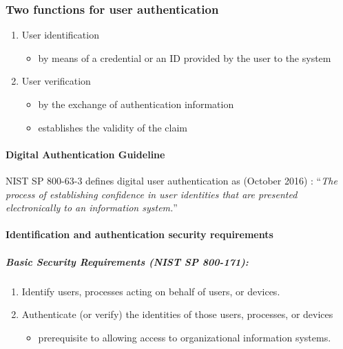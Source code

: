 \documentclass{article}
\begin{document}
                \subsubsection{Two functions for user authentication}
                \begin{enumerate}
                    \item User identification
                    \begin{itemize}
                        \item by means of a credential or an ID provided by the user to the system
                    \end{itemize}
                    \item User verification
                    \begin{itemize}
                        \item by the exchange of authentication information
                        \item establishes the validity of the claim
                    \end{itemize}
                \end{enumerate}
                \paragraph{Digital
                Authentication
                Guideline} NIST SP 800-63-3 defines digital user
                authentication as (October 2016) :
                “\textit{The process of establishing confidence in user
                identities that are presented electronically to an
                information system.}”
                \paragraph{Identification
                and
                authentication
                security
                requirements}

                \subparagraph{Basic Security Requirements (NIST SP 800-171):}
                \begin{enumerate}
                    \item Identify users, processes acting on behalf of users, or devices.
                    \item Authenticate (or verify) the identities of those users, processes, or devices
                    \begin{itemize}
                        \item prerequisite to allowing access to organizational information systems.
                    \end{itemize}
                \end{enumerate}
\end{document}
